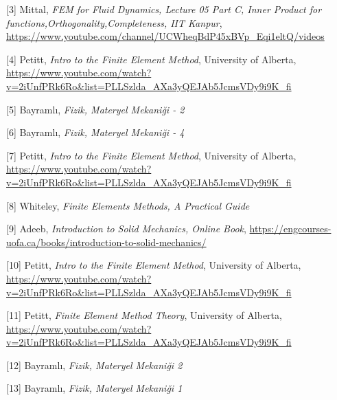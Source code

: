 \documentclass[12pt,fleqn]{article}\usepackage{../../common}
\begin{document}
[3] Mittal, {\em FEM for Fluid Dynamics, Lecture 05 Part C, Inner Product for functions,Orthogonality,Completeness, IIT Kanpur},
    \url{https://www.youtube.com/channel/UCWheqBdP45xBVp_Eqi1eltQ/videos}
    
[4] Petitt, {\em Intro to the Finite Element Method}, University of Alberta,
    \url{https://www.youtube.com/watch?v=2iUnfPRk6Ro&list=PLLSzlda_AXa3yQEJAb5JcmsVDy9i9K_fi}

[5] Bayramlı, {\em Fizik, Materyel Mekaniği - 2}
    
[6] Bayramlı, {\em Fizik, Materyel Mekaniği - 4}

[7] Petitt, {\em Intro to the Finite Element Method}, University of Alberta,
    \url{https://www.youtube.com/watch?v=2iUnfPRk6Ro&list=PLLSzlda_AXa3yQEJAb5JcmsVDy9i9K_fi}

[8] Whiteley, {\em Finite Elements Methods, A Practical Guide}
    
[9] Adeeb, {\em Introduction to Solid Mechanics, Online Book},
    \url{https://engcourses-uofa.ca/books/introduction-to-solid-mechanics/}

[10] Petitt, {\em Intro to the Finite Element Method}, University of Alberta,
    \url{https://www.youtube.com/watch?v=2iUnfPRk6Ro&list=PLLSzlda_AXa3yQEJAb5JcmsVDy9i9K_fi}

[11] Petitt, {\em Finite Element Method Theory}, University of Alberta,
    \url{https://www.youtube.com/watch?v=2iUnfPRk6Ro&list=PLLSzlda_AXa3yQEJAb5JcmsVDy9i9K_fi}

[12] Bayramlı, {\em Fizik, Materyel Mekaniği 2}
    
[13] Bayramlı, {\em Fizik, Materyel Mekaniği 1}
\end{document}
